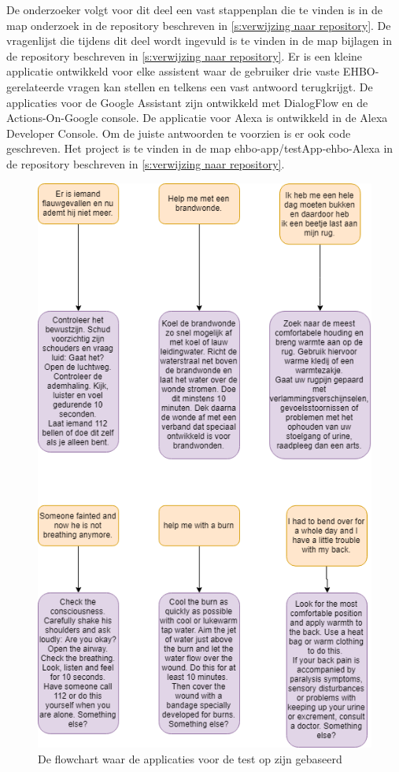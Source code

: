 De onderzoeker volgt voor dit deel een vast stappenplan die te vinden is in de map onderzoek in de repository beschreven in \ref{s:verwijzing naar repository}.
De vragenlijst die tijdens dit deel wordt ingevuld is te vinden in de map bijlagen in de repository beschreven in \ref{s:verwijzing naar repository}.
Er is een kleine applicatie ontwikkeld voor elke assistent waar de gebruiker drie vaste EHBO-gerelateerde vragen kan stellen en telkens een vast antwoord terugkrijgt. De applicaties voor de Google Assistant zijn ontwikkeld met DialogFlow en de Actions-On-Google console. De applicatie voor Alexa is ontwikkeld in de Alexa Developer Console. Om de juiste antwoorden te voorzien is er ook code geschreven. Het project is te vinden in de map ehbo-app/testApp-ehbo-Alexa in de repository beschreven in \ref{s:verwijzing naar repository}.

\begin{figure}[H]
    \centering
    \includegraphics[width=0.7\linewidth]{img/flowdiagram_testapp}
    \caption{De flowchart waar de applicaties voor de test op zijn gebaseerd}
    \label{fig:flowdiagram}
\end{figure}

